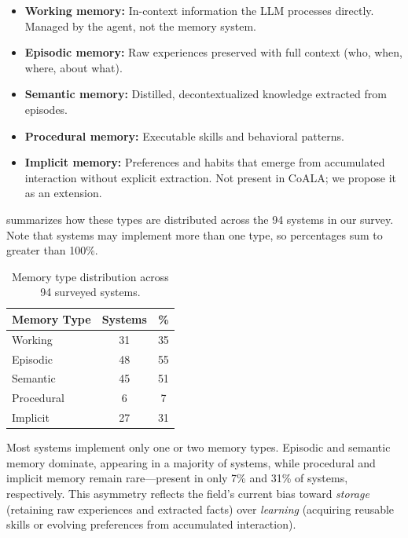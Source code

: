 \begin{itemize}[leftmargin=*, nosep]
    \item \textbf{Working memory:} In-context information the LLM
    processes directly. Managed by the agent, not the memory system.
    \item \textbf{Episodic memory:} Raw experiences preserved with
    full context (who, when, where, about what).
    \item \textbf{Semantic memory:} Distilled, decontextualized
    knowledge extracted from episodes.
    \item \textbf{Procedural memory:} Executable skills and
    behavioral patterns.
    \item \textbf{Implicit memory:} Preferences and habits that
    emerge from accumulated interaction without explicit extraction.
    Not present in CoALA; we propose it as an extension.
\end{itemize}

 summarizes how these types are distributed
across the 94 systems in our survey. Note that systems may implement
more than one type, so percentages sum to greater than 100\%.

\begin{table}[t]
    \centering
    \caption{Memory type distribution across 94 surveyed systems.}
    \label{tab:memory-type-dist}
    \begin{tabular}{lcc}
        \toprule
        \textbf{Memory Type} & \textbf{Systems} & \textbf{\%} \\
        \midrule
        Working      & 31 & 35 \\
        Episodic     & 48 & 55 \\
        Semantic     & 45 & 51 \\
        Procedural   &  6 &  7 \\
        Implicit     & 27 & 31 \\
        \bottomrule
    \end{tabular}
\end{table}

Most systems implement only one or two memory types.
Episodic and semantic memory dominate, appearing in a majority of
systems, while procedural and implicit memory remain rare---present in
only 7\% and 31\% of systems, respectively.
This asymmetry reflects the field's current bias toward
\emph{storage} (retaining raw experiences and extracted facts) over
\emph{learning} (acquiring reusable skills or evolving preferences from
accumulated interaction).

